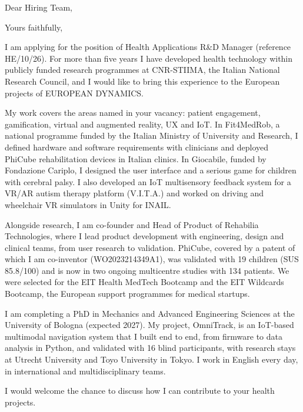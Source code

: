 \documentclass[11pt,a4paper,sans]{moderncv}
\begin{document}

\opening{Dear Hiring Team,}
\closing{Yours faithfully,}
\makelettertitle

I am applying for the position of Health Applications R\&D Manager (reference HE/10/26). For more than five years I have developed health technology within publicly funded research programmes at CNR-STIIMA, the Italian National Research Council, and I would like to bring this experience to the European projects of EUROPEAN DYNAMICS.

My work covers the areas named in your vacancy: patient engagement, gamification, virtual and augmented reality, UX and IoT. In Fit4MedRob, a national programme funded by the Italian Ministry of University and Research, I defined hardware and software requirements with clinicians and deployed PhiCube rehabilitation devices in Italian clinics. In Giocabile, funded by Fondazione Cariplo, I designed the user interface and a serious game for children with cerebral palsy. I also developed an IoT multisensory feedback system for a VR/AR autism therapy platform (V.I.T.A.) and worked on driving and wheelchair VR simulators in Unity for INAIL.

Alongside research, I am co-founder and Head of Product of Rehabilia Technologies, where I lead product development with engineering, design and clinical teams, from user research to validation. PhiCube, covered by a patent of which I am co-inventor (WO2023214349A1), was validated with 19 children (SUS 85.8/100) and is now in two ongoing multicentre studies with 134 patients. We were selected for the EIT Health MedTech Bootcamp and the EIT Wildcards Bootcamp, the European support programmes for medical startups.

I am completing a PhD in Mechanics and Advanced Engineering Sciences at the University of Bologna (expected 2027). My project, OmniTrack, is an IoT-based multimodal navigation system that I built end to end, from firmware to data analysis in Python, and validated with 16 blind participants, with research stays at Utrecht University and Toyo University in Tokyo. I work in English every day, in international and multidisciplinary teams.

I would welcome the chance to discuss how I can contribute to your health projects.

\makeletterclosing
\end{document}
